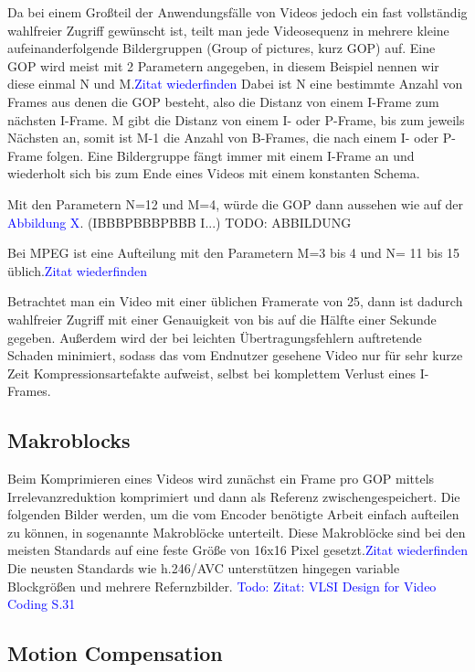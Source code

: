 Da bei einem Großteil der Anwendungsfälle von Videos jedoch ein fast vollständig wahlfreier Zugriff gewünscht ist, teilt man jede Videosequenz in mehrere kleine aufeinanderfolgende Bildergruppen (Group of pictures, kurz GOP) auf. Eine GOP wird meist mit 2 Parametern angegeben, in diesem Beispiel nennen wir diese einmal N und M.\textcolor{blue}{Zitat wiederfinden}
Dabei ist N eine bestimmte Anzahl von Frames aus denen die GOP besteht, also die Distanz von einem I-Frame zum nächsten I-Frame.
M gibt die Distanz von einem I- oder P-Frame, bis zum jeweils Nächsten an, somit ist M-1 die Anzahl von B-Frames, die nach einem I- oder P-Frame folgen. Eine Bildergruppe fängt immer mit einem I-Frame an und wiederholt sich bis zum Ende eines Videos mit einem konstanten Schema.

Mit den Parametern N=12 und M=4, würde die GOP dann aussehen wie auf der \textcolor{blue}{Abbildung X}. (IBBBPBBBPBBB I...) TODO: ABBILDUNG 

Bei MPEG ist eine Aufteilung mit den Parametern M=3 bis 4 und N= 11 bis 15 üblich.\textcolor{blue}{Zitat wiederfinden}

Betrachtet man ein Video mit einer üblichen Framerate von 25, dann ist dadurch wahlfreier Zugriff mit einer Genauigkeit von bis auf die Hälfte einer Sekunde gegeben. Außerdem wird der bei leichten Übertragungsfehlern auftretende Schaden minimiert, sodass das vom Endnutzer gesehene Video nur für sehr kurze Zeit Kompressionsartefakte aufweist, selbst bei komplettem Verlust eines I-Frames. 

\subsection{Makroblocks}

Beim Komprimieren eines Videos wird zunächst ein Frame pro GOP mittels Irrelevanzreduktion komprimiert und dann als Referenz zwischengespeichert. Die folgenden Bilder werden, um die vom Encoder benötigte Arbeit einfach aufteilen zu können, in sogenannte Makroblöcke unterteilt. Diese Makroblöcke sind bei den meisten Standards auf eine feste Größe von 16x16 Pixel gesetzt.\textcolor{blue}{Zitat wiederfinden} Die neusten Standards wie h.246/AVC unterstützen hingegen variable Blockgrößen und mehrere Refernzbilder. \textcolor{blue}{Todo: Zitat: VLSI Design for Video Coding S.31} 

\subsection{Motion Compensation}

